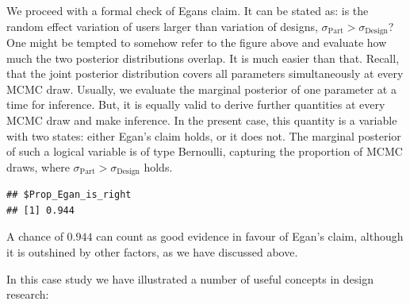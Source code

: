 \documentclass[]{svmono}
\newenvironment{Shaded}{\begin{snugshade}}{\end{snugshade}}
\newcommand{\KeywordTok}[1]{\textcolor[rgb]{0.13,0.29,0.53}{\textbf{#1}}}
\newcommand{\DataTypeTok}[1]{\textcolor[rgb]{0.13,0.29,0.53}{#1}}
\newcommand{\DecValTok}[1]{\textcolor[rgb]{0.00,0.00,0.81}{#1}}
\newcommand{\StringTok}[1]{\textcolor[rgb]{0.31,0.60,0.02}{#1}}
\newcommand{\OperatorTok}[1]{\textcolor[rgb]{0.81,0.36,0.00}{\textbf{#1}}}
\newcommand{\NormalTok}[1]{#1}
\begin{document}
We proceed with a formal check of Egans claim. It can be stated as: is
the random effect variation of users larger than variation of designs,
\(\sigma_ \textrm{Part} > \sigma_ \textrm{Design}\)? One might be
tempted to somehow refer to the figure above and evaluate how much the
two posterior distributions overlap. It is much easier than that.
Recall, that the joint posterior distribution covers all parameters
simultaneously at every MCMC draw. Usually, we evaluate the marginal
posterior of one parameter at a time for inference. But, it is equally
valid to derive further quantities at every MCMC draw and make
inference. In the present case, this quantity is a variable with two
states: either Egan's claim holds, or it does not. The marginal
posterior of such a logical variable is of type Bernoulli, capturing the
proportion of MCMC draws, where
\(\sigma_ \textrm{Part} > \sigma_ \textrm{Design}\) holds.

\begin{Shaded}
\end{Shaded}

\begin{verbatim}
## $Prop_Egan_is_right
## [1] 0.944
\end{verbatim}

A chance of \(0.944\) can count as good evidence in favour of Egan's
claim, although it is outshined by other factors, as we have discussed
above.

In this case study we have illustrated a number of useful concepts in
design research:
\end{document}
